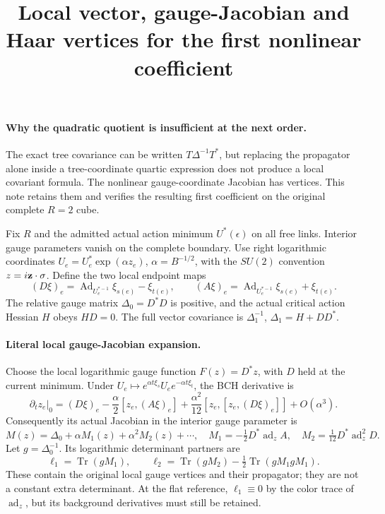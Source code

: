 \documentclass[11pt]{article}
\title{Local vector, gauge-Jacobian and Haar vertices for the first nonlinear coefficient}\author{}\date{}
\begin{document}
\maketitle
\paragraph{Why the quadratic quotient is insufficient at the next order.}
The exact tree covariance can be written $T\Delta^{-1}T^*$, but replacing
the propagator alone inside a tree-coordinate quartic expression does
not produce a local covariant formula. The nonlinear gauge-coordinate
Jacobian has vertices. This note retains them and verifies the resulting
first coefficient on the original complete $R=2$ cube.

Fix $R$ and the admitted actual action minimum $U^*(\epsilon)$ on all
free links. Interior gauge parameters vanish on the complete boundary.
Use right logarithmic coordinates $U_e=U_e^*\exp(\alpha z_e)$,
$\alpha=B^{-1/2}$, with the $SU(2)$ convention $z=i{\bf z}\cdot\sigma$.
Define the two local endpoint maps
\[
 (D\xi)_e=\operatorname{Ad}_{U_e^{*-1}}\xi_{s(e)}-\xi_{t(e)},\qquad
 (A\xi)_e=\operatorname{Ad}_{U_e^{*-1}}\xi_{s(e)}+\xi_{t(e)}.
\]
The relative gauge matrix $\Delta_0=D^*D$ is positive, and the actual
critical action Hessian $H$ obeys $HD=0$. The full vector covariance is
$\Delta_1^{-1}$, $\Delta_1=H+DD^*$.

\paragraph{Literal local gauge-Jacobian expansion.}
Choose the local logarithmic gauge function $F(z)=D^*z$, with $D$
held at the current minimum. Under
$U_e\mapsto e^{\alpha t\xi_s}U_e e^{-\alpha t\xi_t}$, the BCH derivative is
\[
 \left.\partial_t z_e\right|_0
 = (D\xi)_e-\frac{\alpha}{2}[z_e,(A\xi)_e]
       +\frac{\alpha^2}{12}[z_e,[z_e,(D\xi)_e]]+O(\alpha^3).
\]
Consequently its actual Jacobian in the interior gauge parameter is
\[
 M(z)=\Delta_0+\alpha M_1(z)+\alpha^2 M_2(z)+\cdots,\quad
 M_1=-\tfrac12D^*\operatorname{ad}_z A,\quad
 M_2=\tfrac1{12}D^*\operatorname{ad}_z^2 D .
\]
Let $g=\Delta_0^{-1}$. Its logarithmic determinant partners are
\[
 \ell_1=\operatorname{Tr}(gM_1),\qquad
 \ell_2=\operatorname{Tr}(gM_2)-\tfrac12\operatorname{Tr}(gM_1gM_1).
                                                               \tag{1}
\]
These contain the original local gauge vertices and their propagator;
they are not a constant extra determinant. At the flat reference,
$\ell_1\equiv0$ by the color trace of $\operatorname{ad}_z$, but its
background derivatives must still be retained.
\end{document}
